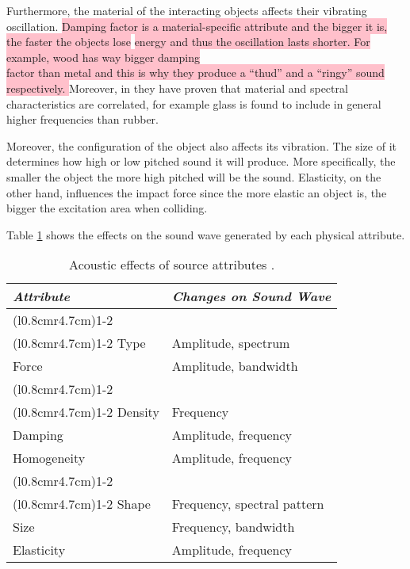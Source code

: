 Furthermore, the material of the interacting objects affects their vibrating oscillation. \colorbox{pink}{Damping factor is a material-specific attribute and the bigger it is, the faster the objects lose} \colorbox{pink}{energy and thus the oscillation lasts shorter. For example, wood has way bigger damping}\\ \colorbox{pink}{factor than metal and this is why they produce a ``thud'' and a ``ringy'' sound respectively. } Moreover, in \cite{klatzky2000perception} they have proven that material and spectral characteristics are correlated, for example glass is found to include in general higher frequencies than rubber. 

Moreover, the configuration of the object also affects its vibration. The size of it determines how high or low pitched sound it will produce. More specifically, the smaller the object the more high pitched will be the sound. Elasticity, on the other hand, influences the impact force since the more elastic an object is, the bigger the excitation area when colliding.  

Table \ref{tab:acoustic_effects} shows the effects on the sound wave generated by each physical attribute. 

\begin{table}[H]
	\centering
    \begin{tabular}{  l  l }
    \toprule
     \addlinespace
    \textbf{\textit{Attribute}} & \textbf{\textit{Changes on Sound Wave}} \\ \toprule
    \addlinespace
\cmidrule(l{0.8cm}r{4.7cm}){1-2}
    \multicolumn{2}{l}{\hspace{0.8cm}\textit{Interaction}} \\ \cmidrule(l{0.8cm}r{4.7cm}){1-2}
     Type & Amplitude, spectrum \\ 
     Force & Amplitude, bandwidth \\
     \addlinespace
\cmidrule(l{0.8cm}r{4.7cm}){1-2}
    \multicolumn{2}{l}{\hspace{1cm}\textit{Material}} \\ \cmidrule(l{0.8cm}r{4.7cm}){1-2}
    Density & Frequency \\
    Damping & Amplitude, frequency \\
    Homogeneity & Amplitude, frequency \\
     \addlinespace
\cmidrule(l{0.8cm}r{4.7cm}){1-2}
    \multicolumn{2}{l}{\hspace{0.6cm}\textit{Configuration}} \\ \cmidrule(l{0.8cm}r{4.7cm}){1-2}
    Shape & Frequency, spectral pattern \\ 
    Size & Frequency, bandwidth \\
    Elasticity & Amplitude, frequency \\
    \bottomrule
    \end{tabular}
    \caption{Acoustic effects of source attributes \cite{gaver1993world}.}
    \label{tab:acoustic_effects}
\end{table} 

